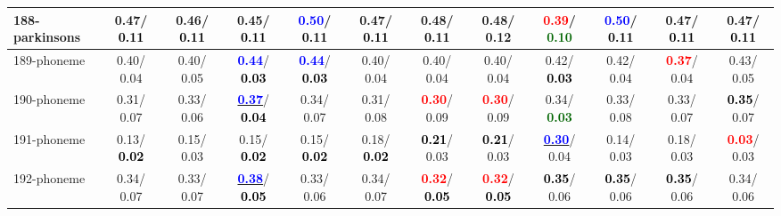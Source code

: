 \begin{table}[h]
\begin{center}
{\begin{tabular}{lc|c|c|c|c|c|c|c|c|c|c}
188-parkinsons &   0.47/\textcolor{black}{\textbf{  0.11}} &   0.46/\textcolor{black}{\textbf{  0.11}} &   0.45/\textcolor{black}{\textbf{  0.11}} & \textcolor{blue}{\textbf{  0.50}}/\textcolor{black}{\textbf{  0.11}} &   0.47/\textcolor{black}{\textbf{  0.11}} &   0.48/\textcolor{black}{\textbf{  0.11}} &   0.48/  0.12 & \textcolor{red}{\textbf{  0.39}}/\textcolor{darkgreen}{\textbf{  0.10}} & \textcolor{blue}{\textbf{  0.50}}/\textcolor{black}{\textbf{  0.11}} &   0.47/\textcolor{black}{\textbf{  0.11}} &   0.47/\textcolor{black}{\textbf{  0.11}} \\ \hline
189-phoneme &   0.40/  0.04 &   0.40/  0.05 & \textcolor{blue}{\textbf{  0.44}}/\textcolor{black}{\textbf{  0.03}} & \textcolor{blue}{\textbf{  0.44}}/\textcolor{black}{\textbf{  0.03}} &   0.40/  0.04 &   0.40/  0.04 &   0.40/  0.04 &   0.42/\textcolor{black}{\textbf{  0.03}} &   0.42/  0.04 & \textcolor{red}{\textbf{  0.37}}/  0.04 &   0.43/  0.05 \\
190-phoneme &   0.31/  0.07 &   0.33/  0.06 & \underline{\textcolor{blue}{\textbf{  0.37}}}/\textcolor{black}{\textbf{  0.04}} &   0.34/  0.07 &   0.31/  0.08 & \textcolor{red}{\textbf{  0.30}}/  0.09 & \textcolor{red}{\textbf{  0.30}}/  0.09 &   0.34/\textcolor{darkgreen}{\textbf{  0.03}} &   0.33/  0.08 &   0.33/  0.07 & \textcolor{black}{\textbf{  0.35}}/  0.07 \\
191-phoneme &   0.13/\textcolor{black}{\textbf{  0.02}} &   0.15/  0.03 &   0.15/\textcolor{black}{\textbf{  0.02}} &   0.15/\textcolor{black}{\textbf{  0.02}} &   0.18/\textcolor{black}{\textbf{  0.02}} & \textcolor{black}{\textbf{  0.21}}/  0.03 & \textcolor{black}{\textbf{  0.21}}/  0.03 & \underline{\textcolor{blue}{\textbf{  0.30}}}/  0.04 &   0.14/  0.03 &   0.18/  0.03 & \textcolor{red}{\textbf{  0.03}}/  0.03 \\
192-phoneme &   0.34/  0.07 &   0.33/  0.07 & \underline{\textcolor{blue}{\textbf{  0.38}}}/\textcolor{black}{\textbf{  0.05}} &   0.33/  0.06 &   0.34/  0.07 & \textcolor{red}{\textbf{  0.32}}/\textcolor{black}{\textbf{  0.05}} & \textcolor{red}{\textbf{  0.32}}/\textcolor{black}{\textbf{  0.05}} & \textcolor{black}{\textbf{  0.35}}/  0.06 & \textcolor{black}{\textbf{  0.35}}/  0.06 & \textcolor{black}{\textbf{  0.35}}/  0.06 &   0.34/  0.06 \\\end{tabular}}\label{stratsALCKappa5Allalla}
\end{center}
\end{table}
